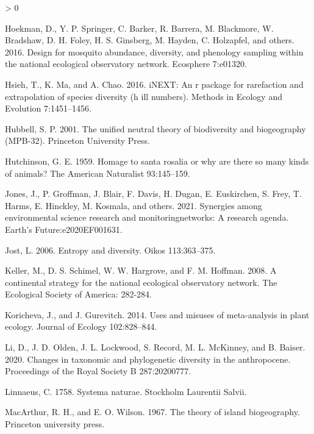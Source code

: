 \documentclass[
  12pt,
]{article}
\newlength{\cslhangindent}
\newenvironment{CSLReferences}[2] %
 {%
  \setlength{\parindent}{0pt}
  \ifodd #1 \everypar{\setlength{\hangindent}{\cslhangindent}}\ignorespaces\fi
  \ifnum #2 > 0
  \setlength{\parskip}{#2\baselineskip}
  \fi
 }%
 {}
\begin{document}
\begin{CSLReferences}{1}{0}
\leavevmode\hypertarget{ref-hoekman2016design}{}%
Hoekman, D., Y. P. Springer, C. Barker, R. Barrera, M. Blackmore, W. Bradshaw, D. H. Foley, H. S. Ginsberg, M. Hayden, C. Holzapfel, and others. 2016. Design for mosquito abundance, diversity, and phenology sampling within the national ecological observatory network. Ecosphere 7:e01320.

\leavevmode\hypertarget{ref-hsieh2016inext}{}%
Hsieh, T., K. Ma, and A. Chao. 2016. iNEXT: An r package for rarefaction and extrapolation of species diversity (h ill numbers). Methods in Ecology and Evolution 7:1451--1456.

\leavevmode\hypertarget{ref-hubbell2001unified}{}%
Hubbell, S. P. 2001. The unified neutral theory of biodiversity and biogeography (MPB-32). Princeton University Press.

\leavevmode\hypertarget{ref-hutchinson1959homage}{}%
Hutchinson, G. E. 1959. Homage to santa rosalia or why are there so many kinds of animals? The American Naturalist 93:145--159.

\leavevmode\hypertarget{ref-jones2021synergies}{}%
Jones, J., P. Groffman, J. Blair, F. Davis, H. Dugan, E. Euskirchen, S. Frey, T. Harms, E. Hinckley, M. Kosmala, and others. 2021. Synergies among environmental science research and monitoringnetworks: A research agenda. Earth's Future:e2020EF001631.

\leavevmode\hypertarget{ref-jost2006entropy}{}%
Jost, L. 2006. Entropy and diversity. Oikos 113:363--375.

\leavevmode\hypertarget{ref-keller2008continental}{}%
Keller, M., D. S. Schimel, W. W. Hargrove, and F. M. Hoffman. 2008. A continental strategy for the national ecological observatory network. The Ecological Society of America: 282-284.

\leavevmode\hypertarget{ref-koricheva2014uses}{}%
Koricheva, J., and J. Gurevitch. 2014. Uses and misuses of meta-analysis in plant ecology. Journal of Ecology 102:828--844.

\leavevmode\hypertarget{ref-li2020changes}{}%
Li, D., J. D. Olden, J. L. Lockwood, S. Record, M. L. McKinney, and B. Baiser. 2020. Changes in taxonomic and phylogenetic diversity in the anthropocene. Proceedings of the Royal Society B 287:20200777.

\leavevmode\hypertarget{ref-linnaeus1758systema}{}%
Linnaeus, C. 1758. Systema naturae. Stockholm Laurentii Salvii.

\leavevmode\hypertarget{ref-macarthur1967theory}{}%
MacArthur, R. H., and E. O. Wilson. 1967. The theory of island biogeography. Princeton university press.


\end{CSLReferences}
\end{document}

